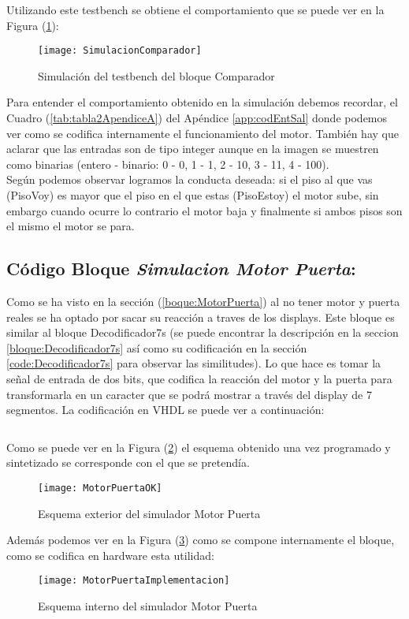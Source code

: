    Utilizando este testbench se obtiene el comportamiento que se puede ver en la Figura (\ref{fig:SimulacionComparador}):

    \begin{figure}[H]
		    \centering
		    \texttt{[image: SimulacionComparador]}
		    \caption{Simulación del testbench del bloque Comparador}
		    \label{fig:SimulacionComparador}
	\end{figure}

	Para entender el comportamiento obtenido en la simulación debemos recordar, el Cuadro (\ref{tab:tabla2ApendiceA}) del Apéndice \ref{app:codEntSal} donde podemos ver como se codifica internamente el funcionamiento del motor. También hay que aclarar que las entradas son de tipo integer aunque en la imagen se muestren como binarias (entero - binario: 0 - 0, 1 - 1, 2 - 10, 3 - 11, 4 - 100). \\
	
	Según podemos observar logramos la conducta deseada: si el piso al que vas (PisoVoy) es mayor que el piso en el que estas (PisoEstoy) el motor sube, sin embargo cuando ocurre lo contrario el motor baja y finalmente si ambos pisos son el mismo el motor se para.

\subsection{Código Bloque \textit{ Simulacion Motor Puerta}:} \label{code:MotorPuerta}
	Como se ha visto en la sección (\ref{boque:MotorPuerta}) al no tener motor y puerta reales se ha optado por sacar su reacción a traves de los displays. Este bloque es similar al bloque Decodificador7s (se puede encontrar la descripción en la seccion \ref{bloque:Decodificador7s} así como su codificación en la sección \ref{code:Decodificador7s} para observar las similitudes). Lo que hace es tomar la señal de entrada de dos bits, que codifica la reacción del motor y la puerta para transformarla en un caracter que se podrá mostrar a través del display de 7 segmentos. La codificación en VHDL se puede ver a continuación: \\ 

	\inputminted[frame=lines,fontsize=\footnotesize,linenos]{vhdl}{CodeFiles/MotorPuerta.vhd}

	Como se puede ver en la Figura (\ref{fig:MotorPuertaOK}) el esquema obtenido una vez programado y sintetizado se corresponde con el que se pretendía.
    \begin{figure}[H]
		    \centering
		    \texttt{[image: MotorPuertaOK]}
		    \caption{Esquema exterior del simulador Motor Puerta}
		    \label{fig:MotorPuertaOK}
	\end{figure}
    Además podemos ver en la Figura (\ref{fig:MotorPuertaImplementacion}) como se compone internamente el bloque, como se codifica en hardware esta utilidad:
    \begin{figure}[H]
		    \centering
		    \texttt{[image: MotorPuertaImplementacion]}
		    \caption{Esquema interno del simulador Motor Puerta}
		    \label{fig:MotorPuertaImplementacion}
	\end{figure}
